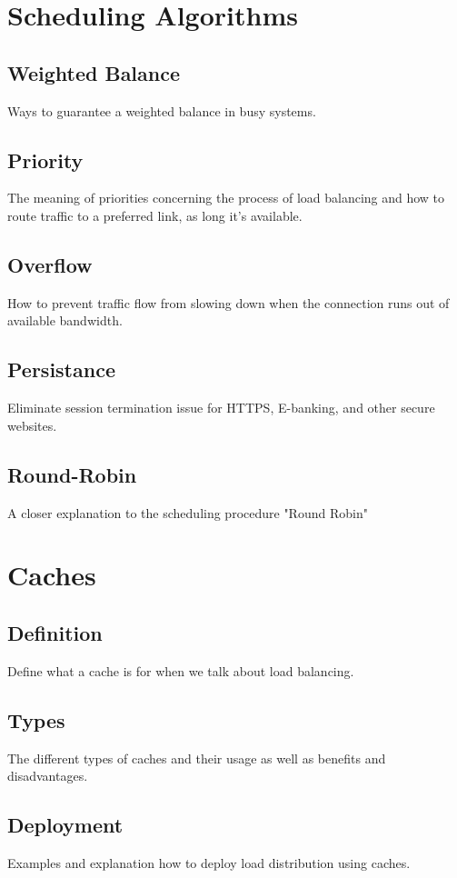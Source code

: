 \documentclass[12p]{article}
\begin{document}
	\newpage
	\section{Scheduling Algorithms}
	\subsection{Weighted Balance}
	Ways to guarantee a weighted balance in busy systems.
	\subsection{Priority}
	The meaning of priorities concerning the process of load balancing and how to route traffic to a preferred link, as long it's available.
	\subsection{Overflow}
	How to prevent traffic flow from slowing down when the connection runs out of available bandwidth.
	\subsection{Persistance}
	Eliminate session termination issue for HTTPS, E-banking, and other secure websites.
	\subsection{Round-Robin}
	A closer explanation to the scheduling procedure "Round Robin"
	
	\newpage
	\section{Caches}
	\subsection{Definition}
	Define what a cache is for when we talk about load balancing.
	\subsection{Types}
	The different types of caches and their usage as well as benefits and disadvantages.
	\subsection{Deployment}
	Examples and explanation how to deploy load distribution using caches.
	
\end{document}
